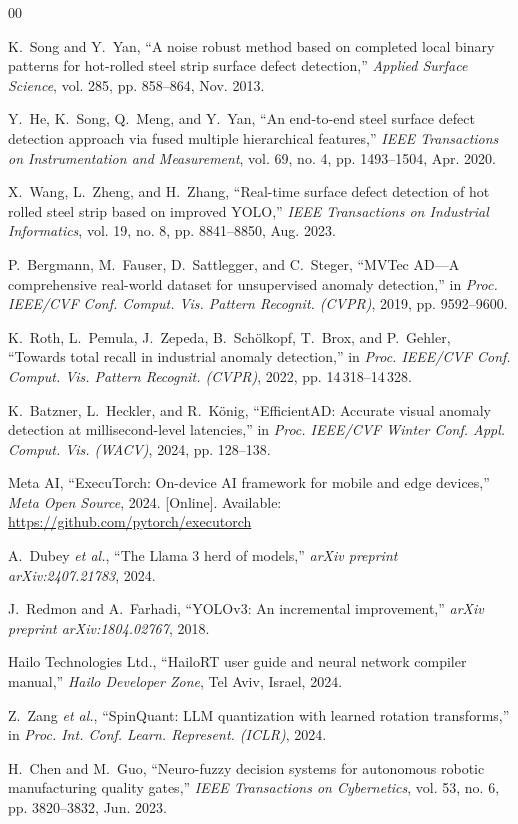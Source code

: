 \documentclass[conference]{IEEEtran}
\begin{document}
\balance
\begin{thebibliography}{00}

K.~Song and Y.~Yan, ``A noise robust method based on completed local binary patterns for hot-rolled steel strip surface defect detection,'' \emph{Applied Surface Science}, vol. 285, pp. 858--864, Nov. 2013.

Y.~He, K.~Song, Q.~Meng, and Y.~Yan, ``An end-to-end steel surface defect detection approach via fused multiple hierarchical features,'' \emph{IEEE Transactions on Instrumentation and Measurement}, vol. 69, no. 4, pp. 1493--1504, Apr. 2020.

X.~Wang, L.~Zheng, and H.~Zhang, ``Real-time surface defect detection of hot rolled steel strip based on improved YOLO,'' \emph{IEEE Transactions on Industrial Informatics}, vol. 19, no. 8, pp. 8841--8850, Aug. 2023.

P.~Bergmann, M.~Fauser, D.~Sattlegger, and C.~Steger, ``MVTec AD---A comprehensive real-world dataset for unsupervised anomaly detection,'' in \emph{Proc. IEEE/CVF Conf. Comput. Vis. Pattern Recognit. (CVPR)}, 2019, pp. 9592--9600.

K.~Roth, L.~Pemula, J.~Zepeda, B.~Sch{\"o}lkopf, T.~Brox, and P.~Gehler, ``Towards total recall in industrial anomaly detection,'' in \emph{Proc. IEEE/CVF Conf. Comput. Vis. Pattern Recognit. (CVPR)}, 2022, pp. 14\,318--14\,328.

K.~Batzner, L.~Heckler, and R.~K{\"o}nig, ``EfficientAD: Accurate visual anomaly detection at millisecond-level latencies,'' in \emph{Proc. IEEE/CVF Winter Conf. Appl. Comput. Vis. (WACV)}, 2024, pp. 128--138.

Meta AI, ``ExecuTorch: On-device AI framework for mobile and edge devices,'' \emph{Meta Open Source}, 2024. [Online]. Available: \url{https://github.com/pytorch/executorch}

A.~Dubey \emph{et al.}, ``The Llama 3 herd of models,'' \emph{arXiv preprint arXiv:2407.21783}, 2024.

J.~Redmon and A.~Farhadi, ``YOLOv3: An incremental improvement,'' \emph{arXiv preprint arXiv:1804.02767}, 2018.

Hailo Technologies Ltd., ``HailoRT user guide and neural network compiler manual,'' \emph{Hailo Developer Zone}, Tel Aviv, Israel, 2024.

Z.~Zang \emph{et al.}, ``SpinQuant: LLM quantization with learned rotation transforms,'' in \emph{Proc. Int. Conf. Learn. Represent. (ICLR)}, 2024.

H.~Chen and M.~Guo, ``Neuro-fuzzy decision systems for autonomous robotic manufacturing quality gates,'' \emph{IEEE Transactions on Cybernetics}, vol. 53, no. 6, pp. 3820--3832, Jun. 2023.

\end{thebibliography}
\end{document}

